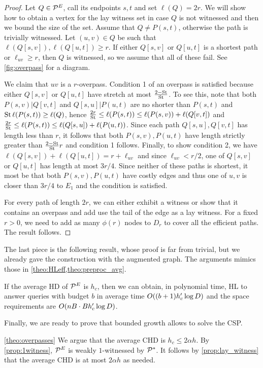 \begin{proof}
Let $Q\in\mathcal{P}^E$, call its endpoints $s,t$ and set $\ell(Q)=2r$.
We will show how to obtain a vertex for the lay witness set in case $Q$ is not witnessed and then we bound the size of the set.
Assume that $Q\neq P(s,t)$, otherwise the path is trivially witnessed.
Let $(u,v)\in Q$ be such that $\ell(Q[s,v]),\ell(Q[u,t])\geq r$. 
If either $Q[s,v]$ or $Q[u,t]$ is a shortest path or $\ell_{uv}\geq r$, then $Q$ is witnessed, so we assume that all of these fail.
See \cref{fig:overpass} for a diagram.

We claim that $uv$ is a $r$-overpass.
Condition 1 of an overpass is satisfied because either $Q[s,v]$ or $Q[u,t]$ have stretch at most $\frac{2-\operatorname{St}}{\operatorname{St}}$.
To see this, note that both $P(s,v)|Q[v,t]$ and $Q[s,u]|P(u,t)$ are no shorter than $P(s,t)$ and $\operatorname{St}\ell(P(s,t))\geq \ell(Q)$, hence
$\frac{2r}{\operatorname{St}}\leq \ell(P(s,t)) \leq  \ell(P(s,v)) + \ell(Q[v,t])$ and $\frac{2r}{\operatorname{St}} \leq \ell(P(s,t)) \leq  \ell(Q[s,u]) + \ell(P(u,t))$.
Since each path $Q[s,u],Q[v,t]$ has length less than $r$, it follows that both $P(s,v),P(u,t)$ have length strictly greater than $\frac{2-\operatorname{St}}{\operatorname{St}}r$ and condition 1 follows. 
Finally, to show condition 2, we have $\ell(Q[s,v])+\ell(Q[u,t])=r+\ell_{uv}$ and since $\ell_{uv}<r/2$, one of $Q[s,v]$ or $Q[u,t]$ has length at most $3r/4$.
Since neither of these paths is shortest, it most be that both $P(s,v),P(u,t)$ have costly edges and thus one of $u,v$ is closer than $3r/4$ to $E_1$ and the condition is satisfied.

For every path of length $2r$, we can either exhibit a witness or show that it contains an overpass and add use the tail of the edge as a lay witness.
For a fixed $r>0$, we need to add as many $\phi(r)$ nodes to $D_r$ to cover all the efficient paths. 
The result follows.
\end{proof}

The last piece is the following result, whose proof is far from trivial, but we already gave the construction with the augmented graph.
The arguments mimics those in \cref{theo:HLeff,theo:preproc_avg}.

\begin{theorem}
If the average HD of $\mathcal{P}^E$ is $h_c$, then we can obtain, in polynomial time, HL to answer queries with budget $b$ in average time $O((b+1)h_c'\log D)$ and the space requirements are $O(nB\cdot Bh_c'\log D)$.
\end{theorem}

Finally, we are ready to prove that bounded growth allows to solve the CSP.

\begin{proofof}{\cref{theo:overpasses}}
We argue that the average CHD is $h_c\leq 2\alpha h$.
By \cref{prop:1witness}, $\mathcal{P}^E$ is weakly $1$-witnessed by $\mathcal{P}^*$.
It follows by \cref{prop:lay_witness} that the average CHD is at most $2\alpha h$ as needed.
\end{proofof}